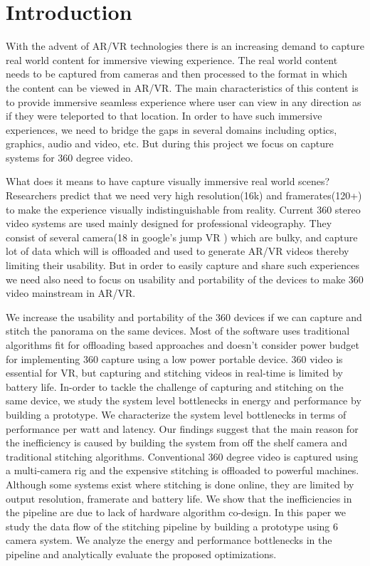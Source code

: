 \chapter{Introduction}

With the advent of AR/VR technologies there is an increasing demand to capture real world content for immersive viewing experience. The real world content needs to be captured from cameras and then processed to the format in which the content can be viewed in AR/VR. The main characteristics of this content is to provide immersive seamless experience where user can view in any direction as if they were teleported to that location. In order to have such immersive experiences, we need to bridge the gaps in several domains including optics, graphics, audio and video, etc. But during this project we focus on capture systems for 360 degree video. \newline

What does it means to have capture visually immersive real world scenes? Researchers \cite{cuervo2018creating} predict that we need very high resolution(16k) and framerates(120+) to make the experience visually indistinguishable from reality. Current 360 stereo video systems are used mainly designed for professional videography. They consist of several camera(18 in google's jump VR \cite{richardt2017video}) which are bulky, and capture lot of data which will is offloaded and used to generate AR/VR videos thereby limiting their usability. But in order to easily capture and share such experiences we need also need to focus on usability and portability of the devices to make 360 video mainstream in AR/VR.

We increase the usability and portability of the 360 devices if we can capture and stitch the panorama on the same devices. Most of the software uses traditional algorithms fit for offloading based approaches and doesn't consider power budget for implementing 360 capture using a low power portable device. 
360 video is essential for VR, but capturing and stitching videos in real-time is limited by battery life. In-order to tackle the challenge of capturing and stitching on the same device, we study the system level bottlenecks in energy and performance by building a prototype. We characterize the system level bottlenecks in terms of performance per watt and latency. %
Our findings suggest that the main reason for the inefficiency is caused by building the system from off the shelf camera and traditional stitching algorithms. Conventional 360 degree video is captured using a multi-camera rig and the expensive stitching is offloaded to powerful machines. Although some systems exist where stitching is done online, they are limited by output resolution, framerate and battery life. We show that the inefficiencies in the pipeline are due to lack of hardware algorithm co-design. In this paper we study the data flow of the stitching pipeline by building a prototype using 6 camera system. We analyze the energy and performance bottlenecks in the pipeline and analytically evaluate the proposed optimizations. 
 
